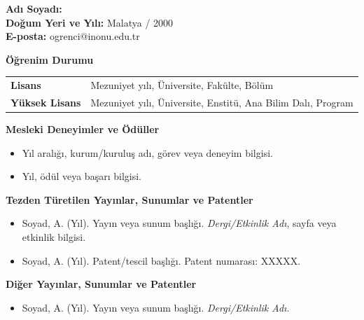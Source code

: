 \vspace{10mm}

\noindent\textbf{Adı Soyadı:} \tezyazaradsoyad\\
\textbf{Doğum Yeri ve Yılı:} Malatya / 2000\\
\textbf{E-posta:} ogrenci@inonu.edu.tr

\vspace{6mm}
\noindent\textbf{Öğrenim Durumu}

\vspace{2mm}
\begin{tabular}{@{}p{30mm}p{108mm}@{}}
\textbf{Lisans} & Mezuniyet yılı, Üniversite, Fakülte, Bölüm \\
\textbf{Yüksek Lisans} & Mezuniyet yılı, Üniversite, Enstitü, Ana Bilim Dalı, Program \\
\end{tabular}

\vspace{6mm}
\noindent\textbf{Mesleki Deneyimler ve Ödüller}

\begin{itemize}
  \item Yıl aralığı, kurum/kuruluş adı, görev veya deneyim bilgisi.
  \item Yıl, ödül veya başarı bilgisi.
\end{itemize}

\vspace{3mm}
\noindent\textbf{Tezden Türetilen Yayınlar, Sunumlar ve Patentler}

\begin{itemize}
  \item Soyad, A. (Yıl). Yayın veya sunum başlığı. \textit{Dergi/Etkinlik Adı}, sayfa veya etkinlik bilgisi.
  \item Soyad, A. (Yıl). Patent/tescil başlığı. Patent numarası: XXXXX.
\end{itemize}

\vspace{3mm}
\noindent\textbf{Diğer Yayınlar, Sunumlar ve Patentler}

\begin{itemize}
  \item Soyad, A. (Yıl). Yayın veya sunum başlığı. \textit{Dergi/Etkinlik Adı}.
\end{itemize}
